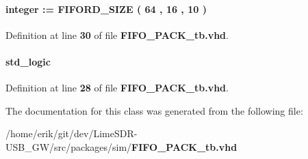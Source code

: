 \paragraph[{rdwidth}]{ {\bfseries \textcolor{comment}{integer}\textcolor{vhdlchar}{ }\textcolor{vhdlchar}{ }\textcolor{vhdlchar}{\+:}\textcolor{vhdlchar}{=}\textcolor{vhdlchar}{ }\textcolor{vhdlchar}{ }\textcolor{vhdlchar}{ }\textcolor{vhdlchar}{ }\textcolor{vhdlchar}{F\+I\+F\+O\+R\+D\+\_\+\+S\+I\+ZE}\textcolor{vhdlchar}{ }\textcolor{vhdlchar}{(}\textcolor{vhdlchar}{ }\textcolor{vhdlchar}{ } \textcolor{vhdldigit}{64} \textcolor{vhdlchar}{ }\textcolor{vhdlchar}{,}\textcolor{vhdlchar}{ }\textcolor{vhdlchar}{ } \textcolor{vhdldigit}{16} \textcolor{vhdlchar}{ }\textcolor{vhdlchar}{,}\textcolor{vhdlchar}{ }\textcolor{vhdlchar}{ } \textcolor{vhdldigit}{10} \textcolor{vhdlchar}{ }\textcolor{vhdlchar}{)}\textcolor{vhdlchar}{ }} \hspace{0.3cm}{\ttfamily [Signal]}}\label{classFIFO__PACK__tb_1_1tb__behave_aa6958ddfb3bb7a52b1c8bbbc84795b7a}


Definition at line {\bf 30} of file {\bf F\+I\+F\+O\+\_\+\+P\+A\+C\+K\+\_\+tb.\+vhd}.

\paragraph[{reset\+\_\+n}]{ {\bfseries \textcolor{comment}{std\+\_\+logic}\textcolor{vhdlchar}{ }} \hspace{0.3cm}{\ttfamily [Signal]}}\label{classFIFO__PACK__tb_1_1tb__behave_a1f070fd63a3a7fa45c907335ea870c5b}


Definition at line {\bf 28} of file {\bf F\+I\+F\+O\+\_\+\+P\+A\+C\+K\+\_\+tb.\+vhd}.



The documentation for this class was generated from the following file\+:\begin{DoxyCompactItemize}
\item 
/home/erik/git/dev/\+Lime\+S\+D\+R-\/\+U\+S\+B\+\_\+\+G\+W/src/packages/sim/{\bf F\+I\+F\+O\+\_\+\+P\+A\+C\+K\+\_\+tb.\+vhd}\end{DoxyCompactItemize}
